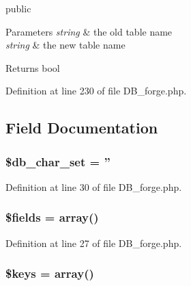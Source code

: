 public 
\begin{DoxyParams}{Parameters}
{\em string} & the old table name \\
\hline
{\em string} & the new table name \\
\hline
\end{DoxyParams}
\begin{DoxyReturn}{Returns}
bool 
\end{DoxyReturn}


Definition at line 230 of file D\-B\-\_\-forge.\-php.



\subsection{Field Documentation}
\hypertarget{class_c_i___d_b__forge_a6e90c3633cd0984a7e8de501f7771c53}{
\subsubsection[{\$db\-\_\-char\-\_\-set}]{\setlength{\rightskip}{0pt plus 5cm}\$db\-\_\-char\-\_\-set = ''}}\label{class_c_i___d_b__forge_a6e90c3633cd0984a7e8de501f7771c53}


Definition at line 30 of file D\-B\-\_\-forge.\-php.

\hypertarget{class_c_i___d_b__forge_ab2303c817e3b402b77b7f99627b9c319}{
\subsubsection[{\$fields}]{\setlength{\rightskip}{0pt plus 5cm}\$fields = array()}}\label{class_c_i___d_b__forge_ab2303c817e3b402b77b7f99627b9c319}


Definition at line 27 of file D\-B\-\_\-forge.\-php.

\hypertarget{class_c_i___d_b__forge_af20635b6c08e03bfee9e3fc036fa80f3}{
\subsubsection[{\$keys}]{\setlength{\rightskip}{0pt plus 5cm}\$keys = array()}}\label{class_c_i___d_b__forge_af20635b6c08e03bfee9e3fc036fa80f3}


